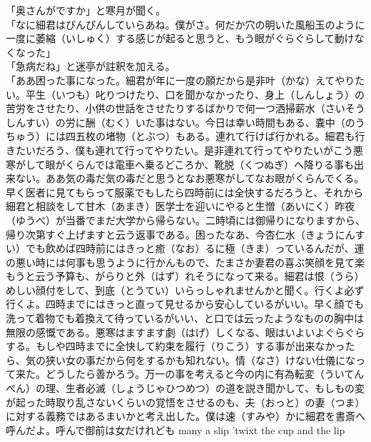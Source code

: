 「奥さんがですか」と寒月が聞く。\\
「なに細君はぴんぴんしていらあね。僕がさ。何だか穴の明いた風船玉のように一度に萎縮（いしゅく）する感じが起ると思うと、もう眼がぐらぐらして動けなくなった」\\
「急病だね」と迷亭が註釈を加える。\\
「ああ困った事になった。細君が年に一度の願だから是非叶（かな）えてやりたい。平生（いつも）叱りつけたり、口を聞かなかったり、身上（しんしょう）の苦労をさせたり、小供の世話をさせたりするばかりで何一つ洒掃薪水（さいそうしんすい）の労に酬（むく）いた事はない。今日は幸い時間もある、嚢中（のうちゅう）には四五枚の堵物（とぶつ）もある。連れて行けば行かれる。細君も行きたいだろう、僕も連れて行ってやりたい。是非連れて行ってやりたいがこう悪寒がして眼がくらんでは電車へ乗るどころか、靴脱（くつぬぎ）へ降りる事も出来ない。ああ気の毒だ気の毒だと思うとなお悪寒がしてなお眼がくらんでくる。早く医者に見てもらって服薬でもしたら四時前には全快するだろうと、それから細君と相談をして甘木（あまき）医学士を迎いにやると生憎（あいにく）昨夜（ゆうべ）が当番でまだ大学から帰らない。二時頃には御帰りになりますから、帰り次第すぐ上げますと云う返事である。困ったなあ、今杏仁水（きょうにんすい）でも飲めば四時前にはきっと癒（なお）るに極（きま）っているんだが、運の悪い時には何事も思うように行かんもので、たまさか妻君の喜ぶ笑顔を見て楽もうと云う予算も、がらりと外（はず）れそうになって来る。細君は恨（うら）めしい顔付をして、到底（とうてい）いらっしゃれませんかと聞く。行くよ必ず行くよ。四時までにはきっと直って見せるから安心しているがいい。早く顔でも洗って着物でも着換えて待っているがいい、と口では云ったようなものの胸中は無限の感慨である。悪寒はますます劇（はげ）しくなる、眼はいよいよぐらぐらする。もしや四時までに全快して約束を履行（りこう）する事が出来なかったら、気の狭い女の事だから何をするかも知れない。情（なさ）けない仕儀になって来た。どうしたら善かろう。万一の事を考えると今の内に有為転変（ういてんぺん）の理、生者必滅（しょうじゃひつめつ）の道を説き聞かして、もしもの変が起った時取り乱さないくらいの覚悟をさせるのも、夫（おっと）の妻（つま）に対する義務ではあるまいかと考え出した。僕は速（すみや）かに細君を書斎へ呼んだよ。呼んで御前は女だけれども
many a slip 'twixt the cup and the lip
